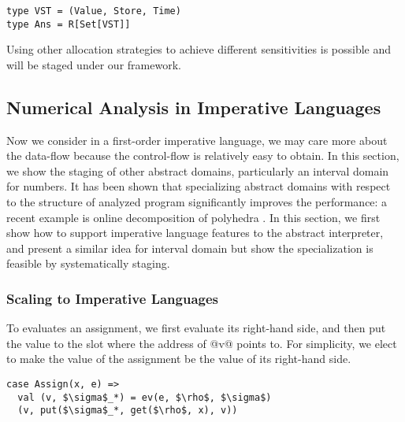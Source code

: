 \begin{lstlisting}
type VST = (Value, Store, Time)
type Ans = R[Set[VST]]
\end{lstlisting}

Using other allocation strategies to achieve different sensitivities is possible \cite{DBLP:conf/icfp/Gilray0M16} 
and will be staged under our framework.
 



\subsection{Numerical Analysis in Imperative Languages} \label{cases_imp}

Now we consider in a first-order imperative language, we may care more about the data-flow because the control-flow
is relatively easy to obtain. In this section, we show the staging of other abstract domains, particularly an 
interval domain for numbers.
It has been shown that specializing abstract domains with respect to the structure of analyzed program significantly 
improves the performance: a recent example is online decomposition of polyhedra \cite{DBLP:conf/popl/SinghPV17, Singh:2017:PCD:3177123.3158143}.
In this section, we first show how to support imperative language features to the abstract interpreter, 
and present a similar idea for interval domain but show the specialization is feasible by systematically staging.

\subsubsection{Scaling to Imperative Languages}

To evaluates an assignment, we first evaluate its right-hand side, and then put the value to the slot where
the address of @v@ points to.
For simplicity, we elect to make the value of the assignment be the value of its right-hand side.

\begin{lstlisting}
case Assign(x, e) =>
  val (v, $\sigma$_*) = ev(e, $\rho$, $\sigma$)
  (v, put($\sigma$_*, get($\rho$, x), v))
\end{lstlisting}

